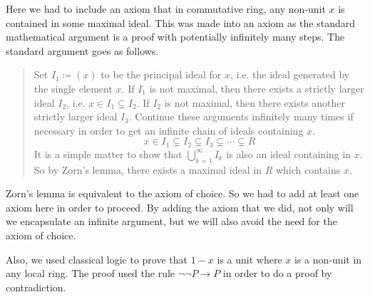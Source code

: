 \documentclass{article}
\begin{document}
Here we had to include an axiom that in commutative ring, any non-unit \(x\) is
contained in some maximal ideal. This was made into an axiom as the standard
mathematical argument is a proof with potentially infinitely many steps. The
standard argument goes as follows.
\begin{quote}
    Set \(I_{1}\coloneqq (x)\) to be the principal ideal for \(x\), i.e. the
    ideal generated by the single element \(x\). If \(I_{1}\) is not maximal,
    then there exists a strictly larger ideal \(I_{2}\), i.e.
    \(x\in I_{1}\subsetneq I_{2}\). If \(I_{2}\) is not maximal, then there
    exists another strictly larger ideal \(I_{3}\). Continue these arguments
    infinitely many times if necessary in order to get an infinite chain of
    ideals containing \(x\).
    \[x\in I_{1}\subsetneq I_{2}\subsetneq I_{3}\subsetneq\cdots\subsetneq R\]
    It is a simple matter to show that \(\bigcup_{k=1}^{\infty} I_{k}\) is also
    an ideal containing in \(x\). So by Zorn's lemma, there exists a maximal
    ideal in \(R\) which contains \(x\).
\end{quote}
Zorn's lemma is equivalent to the axiom of choice. So we had to add at least
one axiom here in order to proceed. By adding the axiom that we did, not only
will we encapsulate an infinite argument, but we will also avoid the need for
the axiom of choice.

Also, we used classical logic to prove that \(1 - x\) is a unit where \(x\) is
a non-unit in any local ring. The proof used the rule \(\neg\neg P\rightarrow
P\) in order to do a proof by contradiction.
\end{document}
